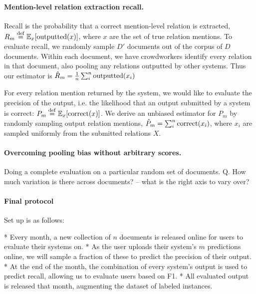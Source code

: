 \paragraph{Mention-level relation extraction recall.}
Recall is the probability that a correct mention-level relation is extracted,
  $R_m \stackrel{\rm def}{=} \mathbb{E}_{x}[\operatorname{outputted}(x)]$, where $x$ are the set of true relation mentions.
To evaluate recall, we randomly sample $D'$ documents out of the corpus of $D$ documents.
Within each document, we have crowdworkers identify every relation in that document, also pooling any relations outputted by other systems. 
Thus our estimator is $\hat{R}_m = \frac{1}{n} \sum_{i}^n \operatorname{outputted}(x_i)$ 




For every relation mention returned by the system, we would like to evaluate the precision of the output, i.e. the likelihood that an output submitted by a system is correct: $P_m \stackrel{\rm def}{=} \mathbb{E}_{x}[\operatorname{correct}(x)]$.
We derive an unbiased estimator for $P_m$ by randomly sampling output relation mentions, $\hat{P}_m = \sum_{i}^n \operatorname{correct}(x_i)$, where $x_i$ are sampled uniformly from the submitted relations $X$.






\paragraph{Overcoming pooling bias without arbitrary scores.}

Doing a complete evaluation on a particular random set of documents.
Q. How much variation is there across documents? -- what is the right axis to vary over? 

\paragraph{Final protocol}



Set up is as follows:

* Every month, a new collection of $n$ documents is released online for users to evaluate their systems on.
* As the user uploads their system's $m$ predictions online, we will sample a fraction of these to predict the precision of their output.
* At the end of the month, the combination of every system's output is used to predict recall, allowing us to evaluate users based on F1.
* All evaluated output is released that month, augmenting the dataset of labeled instances.

